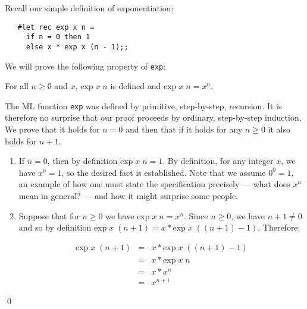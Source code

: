 Recall our simple definition of exponentiation:

\begin{boxed}\begin{verbatim}
   #let rec exp x n =
     if n = 0 then 1
     else x * exp x (n - 1);;
\end{verbatim}\end{boxed}

\noindent We will prove the following property of {\tt exp}:

\begin{theorem}
For all $n \geq 0$ and $x$, $\mbox{exp}\; x\; n$ is defined and $\mbox{exp}\;
x\; n = x^n$.

\proof The ML function {\tt exp} was defined by primitive, step-by-step,
recursion. It is therefore no surprise that our proof proceeds by ordinary,
step-by-step induction. We prove that it holds for $n = 0$ and then that if it
holds for any $n \geq 0$ it also holds for $n + 1$.

\begin{enumerate}

\item If $n = 0$, then by definition $\mbox{exp}\; x\; n = 1$. By definition,
for any integer $x$, we have $x^0 = 1$, so the desired fact is established.
Note that we assume $0^0 = 1$, an example of how one must state the
specification precisely --- what does $x^n$ mean in general? --- and how it
might surprise some people.

\item Suppose that for $n \geq 0$ we have $\mbox{exp}\; x\; n = x^n$. Since $n
\geq 0$, we have $n + 1 \not= 0$ and so by definition $\mbox{exp}\; x\; (n + 1)
= x * \mbox{exp}\; x\; ((n + 1) - 1)$. Therefore:

\begin{eqnarray*}
\mbox{exp}\; x\; (n + 1)   & = & x * \mbox{exp}\; x\; ((n + 1) - 1)     \\
                           & = & x * \mbox{exp}\; x\; n                 \\
                           & = & x * x^n                                \\
                           & = & x^{n + 1}
\end{eqnarray*}

\end{enumerate}

\qed

\end{theorem}

